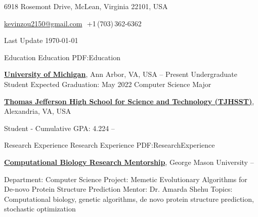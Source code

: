 \documentclass[letterpaper,MMMyyyy,nonstopmode]{simpleresumecv}
\newcommand{\CVAuthor}{Kevin Zou}
\newcommand{\CVNote}{Last Update \today}
\begin{document}

\Title{\CVAuthor}

\begin{SubTitle}
{6918 Rosemont Drive, McLean, Virginia 22101, USA}
\par
\href{mailto:kevinzou2150@gmail.com}{kevinzou2150@gmail.com}
\,\SubBulletSymbol\,+1\,(703)\,362-6362
\par
\CVNote
\end{SubTitle}

\begin{Body}


\Section
{Education}
{Education}
{PDF:Education}

\Entry
\href{https://www.umich.edu/}
{\textbf{University of Michigan}},
Ann Arbor, VA, USA
\hfill
{} -- Present
\Gap
\BulletItem
Undergraduate Student
\hfill
Expected Graduation: May 2022
\BulletItem
Computer Science Major
\Gap

\Entry
\href{https://tjhsst.fcps.edu/}
{\textbf{Thomas Jefferson High School for Science and Technology (TJHSST)}},
Alexandria, VA, USA

\Gap
\BulletItem
Student - Cumulative GPA: 4.224
\hfill
{} --



\Section
{Research Experience}
{Research Experience}
{PDF:ResearchExperience}

\Entry
\href{http://cs.gmu.edu/~ashehu/}
{\textbf{Computational Biology Research Mentorship}},
George Mason University
\hfill
{} -- 

\Gap
\BulletItem
Department: Computer Science
\BulletItem
Project:
Memetic Evolutionary Algorithms for De-novo Protein Structure Prediction
\BulletItem
Mentor:
Dr. Amarda Shehu
\BulletItem
Topics:
Computational biology, genetic algorithms, de novo protein structure prediction, stochastic optimization

\begin{comment}
\Section
{Publications}
{Publications}
{PDF:Publications}

\SubSection
{Conferences}
{Conferences}
{PDF:Conferences}


\end{comment}
\end{Body}
\end{document}
